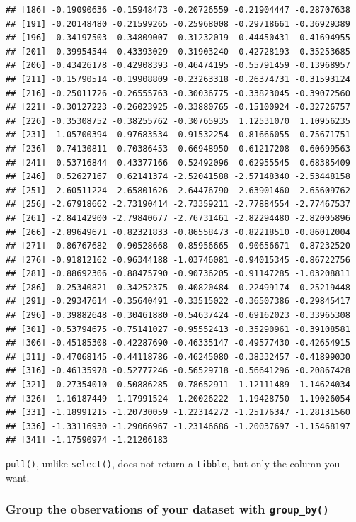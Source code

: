 \documentclass[]{gitbook}
\begin{document}
\begin{verbatim}
## [186] -0.19090636 -0.15948473 -0.20726559 -0.21904447 -0.28707638
## [191] -0.20148480 -0.21599265 -0.25968008 -0.29718661 -0.36929389
## [196] -0.34197503 -0.34809007 -0.31232019 -0.44450431 -0.41694955
## [201] -0.39954544 -0.43393029 -0.31903240 -0.42728193 -0.35253685
## [206] -0.43426178 -0.42908393 -0.46474195 -0.55791459 -0.13968957
## [211] -0.15790514 -0.19908809 -0.23263318 -0.26374731 -0.31593124
## [216] -0.25011726 -0.26555763 -0.30036775 -0.33823045 -0.39072560
## [221] -0.30127223 -0.26023925 -0.33880765 -0.15100924 -0.32726757
## [226] -0.35308752 -0.38255762 -0.30765935  1.12531070  1.10956235
## [231]  1.05700394  0.97683534  0.91532254  0.81666055  0.75671751
## [236]  0.74130811  0.70386453  0.66948950  0.61217208  0.60699563
## [241]  0.53716844  0.43377166  0.52492096  0.62955545  0.68385409
## [246]  0.52627167  0.62141374 -2.52041588 -2.57148340 -2.53448158
## [251] -2.60511224 -2.65801626 -2.64476790 -2.63901460 -2.65609762
## [256] -2.67918662 -2.73190414 -2.73359211 -2.77884554 -2.77467537
## [261] -2.84142900 -2.79840677 -2.76731461 -2.82294480 -2.82005896
## [266] -2.89649671 -0.82321833 -0.86558473 -0.82218510 -0.86012004
## [271] -0.86767682 -0.90528668 -0.85956665 -0.90656671 -0.87232520
## [276] -0.91812162 -0.96344188 -1.03746081 -0.94015345 -0.86722756
## [281] -0.88692306 -0.88475790 -0.90736205 -0.91147285 -1.03208811
## [286] -0.25340821 -0.34252375 -0.40820484 -0.22499174 -0.25219448
## [291] -0.29347614 -0.35640491 -0.33515022 -0.36507386 -0.29845417
## [296] -0.39882648 -0.30461880 -0.54637424 -0.69162023 -0.33965308
## [301] -0.53794675 -0.75141027 -0.95552413 -0.35290961 -0.39108581
## [306] -0.45185308 -0.42287690 -0.46335147 -0.49577430 -0.42654915
## [311] -0.47068145 -0.44118786 -0.46245080 -0.38332457 -0.41899030
## [316] -0.46135978 -0.52777246 -0.56529718 -0.56641296 -0.20867428
## [321] -0.27354010 -0.50886285 -0.78652911 -1.12111489 -1.14624034
## [326] -1.16187449 -1.17991524 -1.20026222 -1.19428750 -1.19026054
## [331] -1.18991215 -1.20730059 -1.22314272 -1.25176347 -1.28131560
## [336] -1.33116930 -1.29066967 -1.23146686 -1.20037697 -1.15468197
## [341] -1.17590974 -1.21206183
\end{verbatim}

\texttt{pull()}, unlike \texttt{select()}, does not return a \texttt{tibble}, but only the column you want.

\hypertarget{group-the-observations-of-your-dataset-with-group_by}{%
\subsubsection{\texorpdfstring{Group the observations of your dataset with \texttt{group\_by()}}{Group the observations of your dataset with group\_by()}}\label{group-the-observations-of-your-dataset-with-group_by}}
\end{document}
